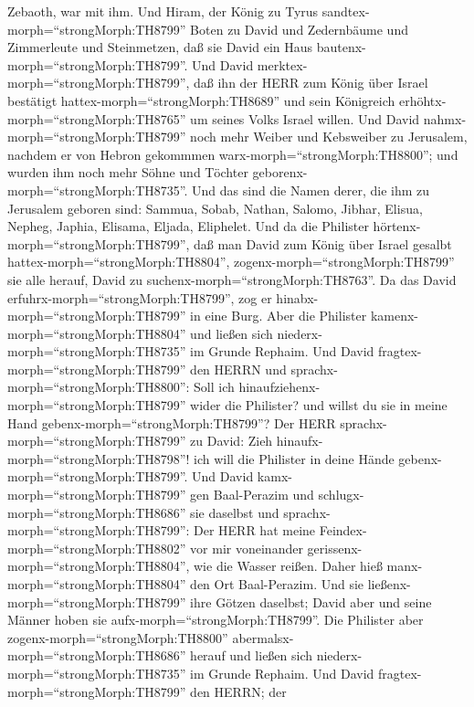 Zebaoth, war mit ihm.  Und Hiram, der König zu Tyrus
sandtex-morph=``strongMorph:TH8799'' Boten zu David und Zedernbäume und
Zimmerleute und Steinmetzen, daß sie David ein Haus
bautenx-morph=``strongMorph:TH8799''.  Und David
merktex-morph=``strongMorph:TH8799'', daß ihn der HERR zum König über
Israel bestätigt hattex-morph=``strongMorph:TH8689'' und sein Königreich
erhöhtx-morph=``strongMorph:TH8765'' um seines Volks Israel willen.
 Und David nahmx-morph=``strongMorph:TH8799'' noch mehr
Weiber und Kebsweiber zu Jerusalem, nachdem er von Hebron gekommmen
warx-morph=``strongMorph:TH8800''; und wurden ihm noch mehr Söhne und
Töchter geborenx-morph=``strongMorph:TH8735''.  Und das
sind die Namen derer, die ihm zu Jerusalem geboren sind: Sammua, Sobab,
Nathan, Salomo,  Jibhar, Elisua, Nepheg, Japhia,
 Elisama, Eljada, Eliphelet.  Und da die
Philister hörtenx-morph=``strongMorph:TH8799'', daß man David zum König
über Israel gesalbt hattex-morph=``strongMorph:TH8804'',
zogenx-morph=``strongMorph:TH8799'' sie alle herauf, David zu
suchenx-morph=``strongMorph:TH8763''. Da das David
erfuhrx-morph=``strongMorph:TH8799'', zog er
hinabx-morph=``strongMorph:TH8799'' in eine Burg.  Aber die
Philister kamenx-morph=``strongMorph:TH8804'' und ließen sich
niederx-morph=``strongMorph:TH8735'' im Grunde Rephaim. 
Und David fragtex-morph=``strongMorph:TH8799'' den HERRN und
sprachx-morph=``strongMorph:TH8800'': Soll ich
hinaufziehenx-morph=``strongMorph:TH8799'' wider die Philister? und
willst du sie in meine Hand gebenx-morph=``strongMorph:TH8799''? Der
HERR sprachx-morph=``strongMorph:TH8799'' zu David: Zieh
hinaufx-morph=``strongMorph:TH8798''! ich will die Philister in deine
Hände gebenx-morph=``strongMorph:TH8799''.  Und David
kamx-morph=``strongMorph:TH8799'' gen Baal-Perazim und
schlugx-morph=``strongMorph:TH8686'' sie daselbst und
sprachx-morph=``strongMorph:TH8799'': Der HERR hat meine
Feindex-morph=``strongMorph:TH8802'' vor mir voneinander
gerissenx-morph=``strongMorph:TH8804'', wie die Wasser reißen. Daher
hieß manx-morph=``strongMorph:TH8804'' den Ort Baal-Perazim.
 Und sie ließenx-morph=``strongMorph:TH8799'' ihre Götzen
daselbst; David aber und seine Männer hoben sie
aufx-morph=``strongMorph:TH8799''.  Die Philister aber
zogenx-morph=``strongMorph:TH8800''
abermalsx-morph=``strongMorph:TH8686'' herauf und ließen sich
niederx-morph=``strongMorph:TH8735'' im Grunde Rephaim. 
Und David fragtex-morph=``strongMorph:TH8799'' den HERRN; der
